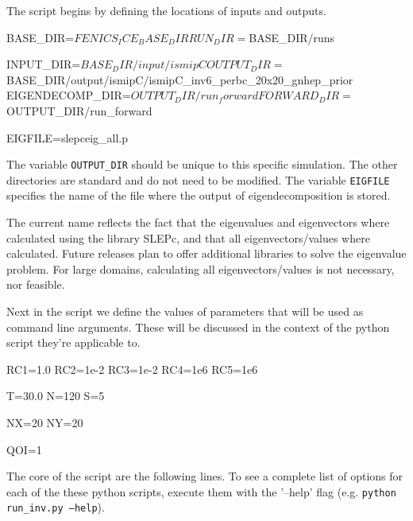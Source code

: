 \documentclass[11pt, reqno, nocenter]{article}
\begin{document}
The script begins by defining the locations of inputs and outputs.

\begin{spverbatim}
BASE_DIR=$FENICS_ICE_BASE_DIR
RUN_DIR=$BASE_DIR/runs

INPUT_DIR=$BASE_DIR/input/ismipC
OUTPUT_DIR=$BASE_DIR/output/ismipC/ismipC_inv6_perbc_20x20_gnhep_prior
EIGENDECOMP_DIR=$OUTPUT_DIR/run_forward
FORWARD_DIR=$OUTPUT_DIR/run_forward

EIGFILE=slepceig_all.p
\end{spverbatim}

The variable {\tt OUTPUT\_DIR} should be unique to this specific simulation. The other directories are standard and do not need to be modified. The variable {\tt EIGFILE} specifies the name of the file where the output of eigendecomposition is stored. 

The current name reflects the fact that the eigenvalues and eigenvectors where calculated using the library SLEPc, and that all eigenvectors/values where calculated. Future releases plan to offer additional libraries to solve the eigenvalue problem. For large domains, calculating all eigenvectors/values is not necessary, nor feasible. 

Next in the script we define the values of parameters that will be used as command line arguments. These will be discussed in the context of the python script they're applicable to.
\begin{spverbatim}
RC1=1.0
RC2=1e-2
RC3=1e-2
RC4=1e6
RC5=1e6

T=30.0
N=120
S=5

NX=20
NY=20

QOI=1
\end{spverbatim}

The core of the script are the following lines. To see a complete list of options for each of the these python scripts, execute them with the '--help' flag (e.g. {\tt python run\_inv.py --help}).


\end{document}
